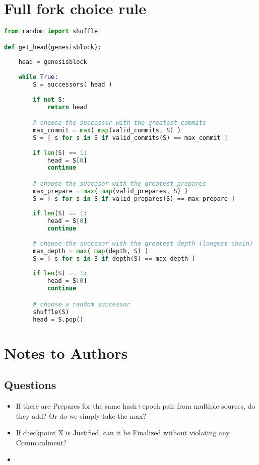 \section{Full fork choice rule}

\begin{lstlisting}[language=Python, caption={Algorithm for determining the head}, captionpos=b, label={alg:forkchoice}]
from random import shuffle

def get_head(genesisblock):
    
    head = genesisblock
    
    while True:
        S = successors( head )
        
        if not S:
            return head

        # choose the successor with the greatest commits
        max_commit = max( map(valid_commits, S) )        
        S = [ s for s in S if valid_commits(S) == max_commit ]
        
        if len(S) == 1:
            head = S[0]
            continue

        # choose the succesor with the greatest prepares
        max_prepare = max( map(valid_prepares, S) )
        S = [ s for s in S if valid_prepares(S) == max_prepare ]
        
        if len(S) == 1:
            head = S[0]
            continue
        
        # choose the succesor with the greatest depth (longest chain)
        max_depth = max( map(depth, S) )
        S = [ s for s in S if depth(S) == max_depth ]
        
        if len(S) == 1:
            head = S[0]
            continue

        # choose a random successor
        shuffle(S)
        head = S.pop()

\end{lstlisting}



\section{Notes to Authors}
\subsection{Questions}
\begin{itemize}
\item If there are Prepares for the same hash+epoch pair from multiple sources, do they add?  Or do we simply take the max?
\item If checkpoint X is Justified, can it be Finalized without violating any Commandment?
\item {}
\end{itemize}


